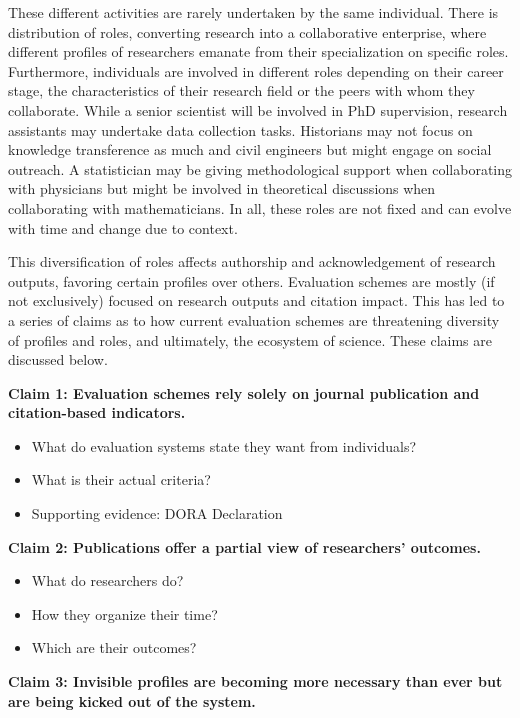 \documentclass[]{elsarticle} %
\providecommand{\tightlist}{%
  \setlength{\itemsep}{0pt}\setlength{\parskip}{0pt}}
\begin{document}
These different activities are rarely undertaken by the same individual.
There is distribution of roles, converting research into a collaborative
enterprise, where different profiles of researchers emanate from their
specialization on specific roles. Furthermore, individuals are involved
in different roles depending on their career stage, the characteristics
of their research field or the peers with whom they collaborate. While a
senior scientist will be involved in PhD supervision, research
assistants may undertake data collection tasks. Historians may not focus
on knowledge transference as much and civil engineers but might engage
on social outreach. A statistician may be giving methodological support
when collaborating with physicians but might be involved in theoretical
discussions when collaborating with mathematicians. In all, these roles
are not fixed and can evolve with time and change due to context.

This diversification of roles affects authorship and acknowledgement of
research outputs, favoring certain profiles over others. Evaluation
schemes are mostly (if not exclusively) focused on research outputs and
citation impact. This has led to a series of claims as to how current
evaluation schemes are threatening diversity of profiles and roles, and
ultimately, the ecosystem of science. These claims are discussed below.

\textbf{Claim 1: Evaluation schemes rely solely on journal publication
and citation-based indicators.}

\begin{itemize}
\tightlist
\item
  What do evaluation systems state they want from individuals?
\item
  What is their actual criteria?
\item
  Supporting evidence: DORA Declaration
\end{itemize}

\textbf{Claim 2: Publications offer a partial view of researchers'
outcomes.}

\begin{itemize}
\tightlist
\item
  What do researchers do?
\item
  How they organize their time?
\item
  Which are their outcomes?
\end{itemize}

\textbf{Claim 3: Invisible profiles are becoming more necessary than
ever but are being kicked out of the system.}
\end{document}
